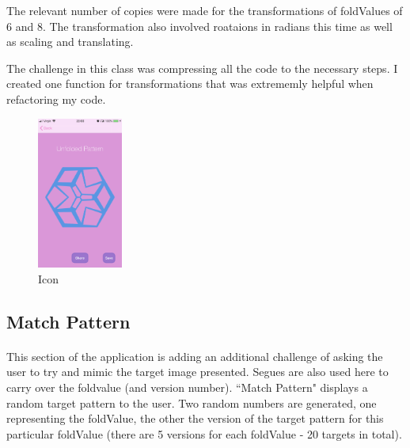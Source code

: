 \documentclass[11pt]{article}
\begin{document}
            The relevant number of copies were made for the transformations of foldValues of 6 and 8. The transformation also involved roataions in radians this time as well as scaling and translating. 
            
            The challenge in this class was compressing all the code to the necessary steps. I created one function for transformations that was extrememly helpful when refactoring my code. 

\begin{figure}
                        \centering
                        \includegraphics[width=0.25\textwidth]{KiriZen/createUnfoldedPattern.png}
                        \caption{Icon}
                        \label{fig:kiriZen-createUnfoldedPattern}
                    \end{figure}


    \subsection{Match Pattern}
            \paragraph{}
            This section of the application is adding an additional challenge of asking the user to try and mimic the target image presented. Segues are also used here to carry over the foldvalue (and version number).
           ``Match Pattern" displays a random target pattern to the user. Two random numbers are generated, one representing the foldValue, the other the version of the target pattern for this particular foldValue (there are 5 versions for each foldValue - 20 targets in total).
\end{document}
